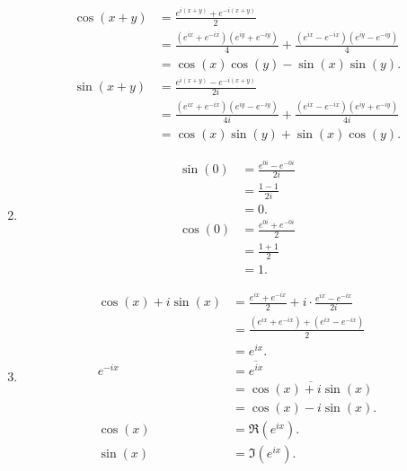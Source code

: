 \documentclass{article}
\begin{document}
\begin{enumerate}[label=(\alph*)]
\begin{align*}
        \cos(x+y) &= \frac{e^{i(x+y)}+e^{-i(x+y)}}{2} \\
                  &= \frac{(e^{ix}+e^{-ix})(e^{iy}+e^{-iy})}{4} + \frac{(e^{ix}-e^{-ix})(e^{iy}-e^{-iy})}{4} \\
                  &= \cos(x)\cos(y) - \sin(x)\sin(y). \\
        \sin(x+y) &= \frac{e^{i(x+y)}-e^{-i(x+y)}}{2i} \\
                  &= \frac{(e^{ix}+e^{-ix})(e^{iy}-e^{-iy})}{4i} + \frac{(e^{ix}-e^{-ix})(e^{iy}+e^{-iy})}{4i} \\
                  &= \cos(x)\sin(y) + \sin(x)\cos(y).
\end{align*}
\item \begin{align*}
        \sin(0) &= \frac{e^{0i}-e^{-0i}}{2i} \\
                &= \frac{1-1}{2i} \\
                &= 0. \\
        \cos(0) &= \frac{e^{0i}+e^{-0i}}{2} \\
                &= \frac{1+1}{2} \\
                &= 1.
\end{align*}
\item \begin{align*}
        \cos(x) + i \sin(x) &= \frac{e^{ix}+e^{-ix}}{2} + i \cdot \frac{e^{ix}-e^{-ix}}{2i} \\
                            &= \frac{(e^{ix}+e^{-ix}) + (e^{ix}-e^{-ix})}{2} \\
                            &= e^{ix}. \\
        e^{-ix} &= \overline{e^{ix}} \\
                &= \overline{\cos(x)+i\sin(x)} \\
                &= \cos(x) - i \sin(x). \\
        \cos(x) &= \Re(e^{ix}). \\
        \sin(x) &= \Im(e^{ix}).
\end{align*}
\end{enumerate}
\end{document}
